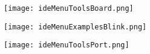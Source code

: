 {\begin{frame}{\insertsubsection}
	\texttt{[image: ideMenuToolsBoard.png]}

\end{frame}


\begin{frame}{\insertsubsection}

	\texttt{[image: ideMenuExamplesBlink.png]}

\end{frame}


\begin{frame}{\insertsubsection}

	\texttt{[image: ideMenuToolsPort.png]}

\end{frame}

} %
